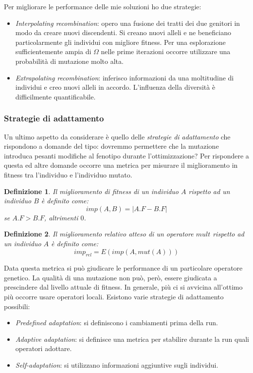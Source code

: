 \documentclass[10pt,a4paper]{article}
\newtheorem{definition}{Definizione}
\begin{document}
Per migliorare le performance delle mie soluzioni ho due strategie:

\begin{itemize}
\item{\emph{Interpolating recombination}: opero una fusione dei tratti dei due genitori in modo da creare nuovi discendenti. Si creano nuovi alleli e ne beneficiano particolarmente gli individui con migliore fitness. Per una esplorazione sufficientemente ampia di $\Omega$ nelle prime iterazioni occorre utilizzare una probabilità di mutazione molto alta.}
\item{\emph{Extrapolating recombination}: inferisco informazioni da una moltitudine di individui e creo nuovi alleli in accordo. L'influenza della diversità è difficilmente quantificabile.}
\end{itemize}

\subsubsection{Strategie di adattamento}

Un ultimo aspetto da considerare è quello delle \emph{strategie di adattamento} che rispondono a domande del tipo: dovremmo permettere che la mutazione introduca pesanti modifiche al fenotipo durante l'ottimizzazione? Per rispondere a questa ed altre domande occorre una metrica per misurare il miglioramento in fitness tra l'individuo e l'individuo mutato. 

\begin{definition}
Il \emph{miglioramento di fitness} di un individuo $A$ rispetto ad un individuo $B$ è definito come:
$$
imp(A,B) = |A.F - B.F|
$$ 
se $A.F > B.F$, altrimenti $0$.
\end{definition}

\begin{definition}
Il \emph{miglioramento relativo atteso} di un operatore $mult$ rispetto ad un individuo $A$ è definito come:
$$
imp_{rel} = E(imp(A,mut(A)))
$$ 
\end{definition}

Data questa metrica si può giudicare le performance di un particolare operatore genetico. La qualità di una mutazione non può, però, essere giudicata a prescindere dal livello attuale di fitness. In generale, più ci si avvicina all'ottimo più occorre usare operatori locali. Esistono varie strategie di adattamento possibili:

\begin{itemize}
\item{\emph{Predefined adaptation}: si definiscono i cambiamenti prima della run.}
\item{\emph{Adaptive adaptation}: si definisce una metrica per stabilire durante la run quali operatori adottare.}
\item{\emph{Self-adaptation}: si utilizzano informazioni aggiuntive sugli individui.}
\end{itemize}
\end{document}
